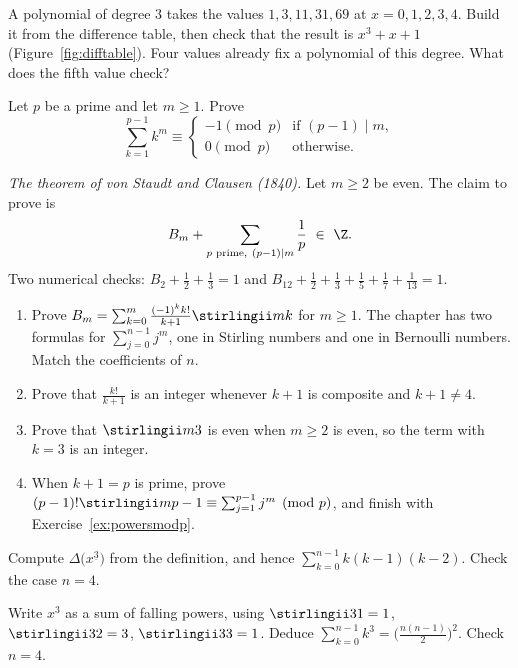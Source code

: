 \begin{exercise}[$\star$]\label{ex:engine}
A polynomial of degree $3$ takes the values $1,3,11,31,69$ at $x=0,1,2,3,4$. Build it from the difference table, then check that the result is $x^3+x+1$ (Figure~\ref{fig:difftable}). Four values already fix a polynomial of this degree. What does the fifth value check?
\end{exercise}

\begin{exercise}[$\star\star$]\label{ex:powersmodp}
Let $p$ be a prime and let $m\ge1$. Prove
\[
\sum_{k=1}^{p-1}k^m\equiv\begin{cases}-1\pmod p&\text{if }(p-1)\mid m,\\0\pmod p&\text{otherwise.}\end{cases}
\]
\end{exercise}

\begin{exercise}[$\star\star\star$]\label{ex:staudt}
\emph{The theorem of von Staudt and Clausen (1840).} Let $m\ge2$ be even. The claim to prove is
\[
B_m+\sum_{p\text{ prime},\ (p-1)\mid m}\frac1p\ \in\ \Z.
\]
Two numerical checks: $B_2+\frac12+\frac13=1$ and $B_{12}+\frac12+\frac13+\frac15+\frac17+\frac1{13}=1$.
\begin{enumerate}[label=(\alph*)]
\item Prove $B_m=\sum_{k=0}^m\frac{(-1)^kk!}{k+1}\stirlingii mk$ for $m\ge1$. The chapter has two formulas for $\sum_{j=0}^{n-1}j^m$, one in Stirling numbers and one in Bernoulli numbers. Match the coefficients of $n$.
\item Prove that $\frac{k!}{k+1}$ is an integer whenever $k+1$ is composite and $k+1\ne4$.
\item Prove that $\stirlingii m3$ is even when $m\ge2$ is even, so the term with $k=3$ is an integer.
\item When $k+1=p$ is prime, prove $(p-1)!\stirlingii m{p-1}\equiv\sum_{j=1}^{p-1}j^m\pmod p$, and finish with Exercise~\ref{ex:powersmodp}.
\end{enumerate}
\end{exercise}

\begin{exercise}[$\star$]\label{ex:rw01a}
Compute $\Delta\bigl(x^{\underline 3}\bigr)$ from the definition, and hence $\sum_{k=0}^{n-1}k(k-1)(k-2)$. Check the case $n=4$.
\end{exercise}

\begin{exercise}[$\star\star$]\label{ex:rw01b}
Write $x^3$ as a sum of falling powers, using $\stirlingii 31=1$, $\stirlingii 32=3$, $\stirlingii 33=1$. Deduce $\sum_{k=0}^{n-1}k^3=\bigl(\frac{n(n-1)}2\bigr)^2$. Check $n=4$.
\end{exercise}

